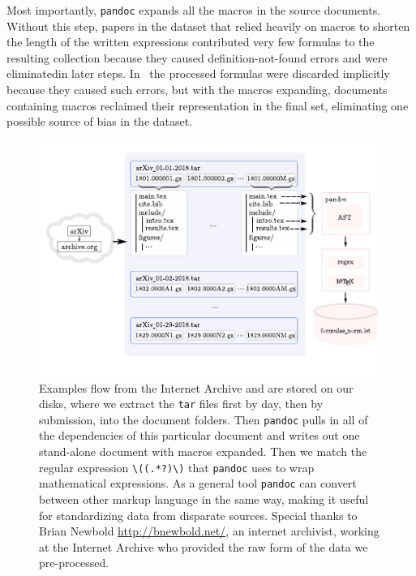 \documentclass{article}
\begin{document}
Most importantly, \texttt{pandoc} expands all the macros in the source
documents. Without this step, papers in the dataset that relied heavily on
macros to shorten the length of the written expressions contributed very few
formulas to the resulting collection because they caused definition-not-found
errors and were eliminatedin later steps. In~\cite{deng2016you} the processed
formulas were discarded implicitly because they caused such errors, but with the
macros expanding, documents containing macros reclaimed their representation in
the final set, eliminating one possible source of bias in the dataset.


\begin{figure}[tbp]
\begin{adjustwidth}{-1in}{-1in}%
		\includegraphics[scale=2.0]{harvest.pdf}
    \centering
\end{adjustwidth}
    \cprotect\caption{Examples flow from the Internet Archive and are stored on
    our disks, where we extract the \texttt{tar} files first by day, then by
    submission, into the document folders. Then \texttt{pandoc} pulls in all of
    the dependencies of this particular document and writes out one stand-alone
    document with macros expanded. Then we match the regular expression
    \verb|\((.*?)\)| that \texttt{pandoc} uses to wrap mathematical expressions.
    As a general tool \texttt{pandoc} can convert between other markup language
    in the same way, making it useful for standardizing data from disparate
    sources. Special thanks to Brian Newbold \url{http://bnewbold.net/}, an
    internet archivist, working at the Internet Archive who provided the raw
    form of the data we pre-processed.}\label{datapipeline}
\end{figure}
\end{document}
